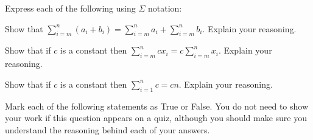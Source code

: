 \documentclass[addpoints,12pt]{exam}
\begin{document}
\begin{questions}
\question Express each of the following using $\Sigma$ notation:




\question Show that $\displaystyle \sum_{i = m}^n (a_i + b_i) = \sum_{i=m}^n a_i + \sum_{i=m}^n b_i$. Explain your reasoning.

\question Show that if $c$ is a constant then $\displaystyle \sum_{i=m}^n c x_i = c \sum_{i=m}^n x_i$. Explain your reasoning.

\question Show that if $c$ is a constant then $\displaystyle \sum_{i=1}^n c = cn$. Explain your reasoning.

\question Mark each of the following statements as True or False. You do not need to show your work if this question appears on a quiz, although you should make sure you understand the reasoning behind each of your answers.
\end{questions}
\end{document}
